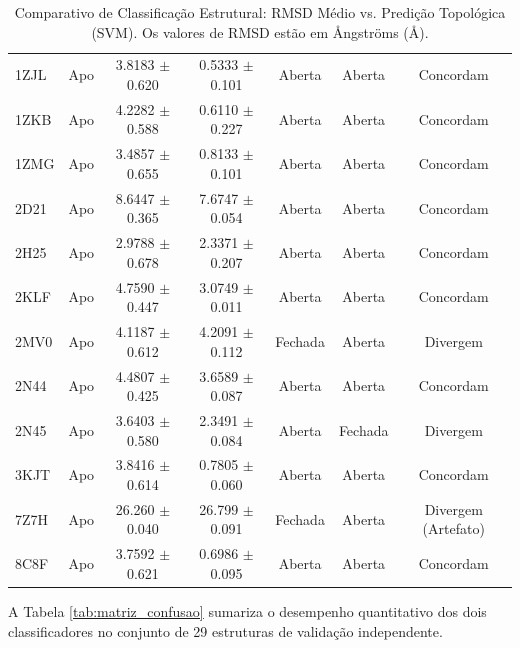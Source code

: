 \documentclass[12pt, a4paper]{article}
\theoremstyle{plain}
\theoremstyle{definition}
\theoremstyle{remark}
\newcommand{\ident}{\hspace{2em}}
\begin{document}
\begin{table}[H]
{\begin{tabular}{lcccccc}
1ZJL & Apo & 3.8183 $\pm$ 0.620 & 0.5333 $\pm$ 0.101 & Aberta & Aberta & Concordam \\
1ZKB & Apo & 4.2282 $\pm$ 0.588 & 0.6110 $\pm$ 0.227 & Aberta & Aberta & Concordam \\
1ZMG & Apo & 3.4857 $\pm$ 0.655 & 0.8133 $\pm$ 0.101 & Aberta & Aberta & Concordam \\
2D21 & Apo & 8.6447 $\pm$ 0.365 & 7.6747 $\pm$ 0.054 & Aberta & Aberta & Concordam \\
2H25 & Apo & 2.9788 $\pm$ 0.678 & 2.3371 $\pm$ 0.207 & Aberta & Aberta & Concordam \\
2KLF & Apo & 4.7590 $\pm$ 0.447 & 3.0749 $\pm$ 0.011 & Aberta & Aberta & Concordam \\
2MV0 & Apo & 4.1187 $\pm$ 0.612 & 4.2091 $\pm$ 0.112 & Fechada & Aberta & Divergem \\
2N44 & Apo & 4.4807 $\pm$ 0.425 & 3.6589 $\pm$ 0.087 & Aberta & Aberta & Concordam \\
2N45 & Apo & 3.6403 $\pm$ 0.580 & 2.3491 $\pm$ 0.084 & Aberta & Fechada & Divergem \\
3KJT & Apo & 3.8416 $\pm$ 0.614 & 0.7805 $\pm$ 0.060 & Aberta & Aberta & Concordam \\
7Z7H & Apo & 26.260 $\pm$ 0.040 & 26.799 $\pm$ 0.091 & Fechada & Aberta & Divergem (Artefato)\\
8C8F & Apo & 3.7592 $\pm$ 0.621 & 0.6986 $\pm$ 0.095 & Aberta & Aberta & Concordam \\
\bottomrule
\end{tabular}%
}
\caption{Comparativo de Classificação Estrutural: RMSD Médio vs. Predição Topológica (SVM). Os valores de RMSD estão em Ångströms (Å).}
\label{tab:comparativo_geral}
\end{table}

\ident A Tabela \ref{tab:matriz_confusao}  sumariza o desempenho quantitativo dos dois classificadores no conjunto de 29 estruturas de validação independente.

\begin{table}[h]
    \centering
    \caption{Comparação quantitativa entre o classificador topológico (SVM sobre paisagens de persistência) e o \emph{baseline} geométrico (RMSD médio), sobre as 29 estruturas mineradas independentemente do conjunto de calibração.} \label{tab:matriz_confusao}
\end{table}
\end{document}
